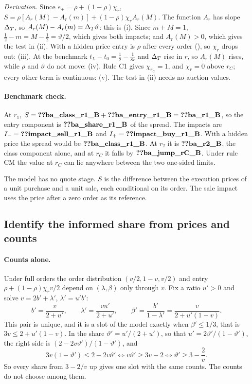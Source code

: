\emph{Derivation.} Since \(e_+=\rho+(1-\rho)\chi_r\), \(S=\rho[A_r(M)-A_r(m)]+(1-\rho)\chi_rA_r(M)\). The function \(A_r\)
has slope \(\Delta_T\), so \(A_r(M)-A_r(m)=\Delta_T\vartheta\): this is (i). Since \(m+M=1\), \(\tfrac12-m=M-\tfrac12=\vartheta/2\),
which gives both impacts; and \(A_r(M)>0\), which gives the test in (ii). With a hidden price entry is \(\rho\) after
every order (), so \(\chi_r\) drops out: (iii). At the benchmark \(t_L-t_0=\tfrac12-\tfrac1{8r}\)
and \(\Delta_T\) rise in \(r\), so \(A_r(M)\) rises, while \(\rho\) and \(\vartheta\) do not move: (iv). Rule C1 gives
\(\chi_{r_C}=1\), and \(\chi_r=0\) above \(r_C\); every other term is continuous: (v). The test in (ii) needs no auction
values.

\paragraph{Benchmark check.} At \(r_1\), \(S=\reg{ba_class_r1_B}+\reg{ba_entry_r1_B}=\reg{ba_r1_B}\), so the entry
component is \(\reg{ba_share_r1_B}\) of the spread. The impacts are \(I_-=\reg{impact_sell_r1_B}\) and
\(I_+=\reg{impact_buy_r1_B}\). With a hidden price the spread would be \(\reg{ba_class_r1_B}\). At \(r_2\) it is
\(\reg{ba_r2_B}\), the class component alone, and at \(r_C\) it falls by \(\reg{ba_jump_rC_B}\). Under rule CM the value
at \(r_C\) can lie anywhere between the two one-sided limits.

\begin{caution}
The model has no quote stage. \(S\) is the difference between the execution prices of a unit purchase and a unit
sale, each conditional on its order. The sale impact uses the price after a zero order as its reference.
\end{caution}

\subsection{Identify the informed share from prices and counts}\label{sec:12_empirical-identification}

\paragraph{Counts alone.} Under full orders the order distribution \((v/2,1-v,v/2)\) and entry \(\rho+(1-\rho)\chi_rv/2\)
depend on \((\lambda,\beta)\) only through \(v\). Fix a ratio \(u'>0\) and solve \(v=2b'+\lambda'\), \(\lambda'=u'b'\):
\[
b'=\frac{v}{2+u'},\qquad \lambda'=\frac{vu'}{2+u'},\qquad \beta'=\frac{b'}{1-\lambda'}=\frac{v}{2+u'(1-v)}.
\]
This pair is unique, and it is a slot of the model exactly when \(\beta'\le1/3\), that is \(3v\le2+u'(1-v)\). In the
share \(\vartheta'=u'/(2+u')\), so that \(u'=2\vartheta'/(1-\vartheta')\), the right side is
\((2-2v\vartheta')/(1-\vartheta')\), and
\[
3v(1-\vartheta')\le2-2v\vartheta'\iff v\vartheta'\ge3v-2\iff\vartheta'\ge3-\frac2v.
\]
So every share from \(3-2/v\) up gives one slot with the same counts. The counts do not choose among them.

